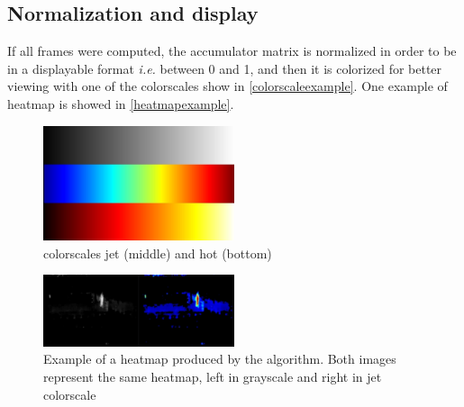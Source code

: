 \documentclass[10pt, conference]{IEEEtran}
\begin{document}
	\subsection{Normalization and display}
	If all frames were computed, the accumulator matrix is normalized in order to be in a displayable format \textit{i.e.} between 0 and 1, and then it is colorized for better viewing with one of the colorscales show in \autoref{colorscaleexample}. One example of heatmap is showed in \autoref{heatmapexample}.
	\begin{figure}[H]
		\centering
		\includegraphics[width=0.5\textwidth,height=0.05\textheight]{figs/colorscaleexample}
		\caption{colorscales jet (middle) and hot (bottom)}
		\label{colorscaleexample}
	\end{figure}
	\begin{figure}[H]
		\centering
		\includegraphics[width=0.5\textwidth]{figs/heatmapexample}
		\caption{Example of a heatmap produced by the algorithm. Both images represent the same heatmap, left in grayscale and right in jet colorscale}
		\label{heatmapexample}
	\end{figure}
	
	
\end{document}
